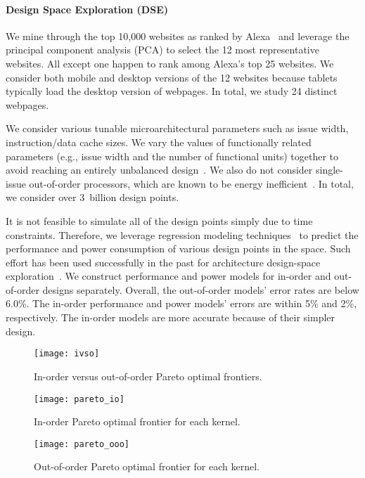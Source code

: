 

\paragraph{Design Space Exploration (DSE)} We mine through the top 10,000 websites as ranked by Alexa~\cite{alexa} and leverage the principal component analysis (PCA) to select the 12 most representative websites. All except one happen to rank among Alexa's top 25 websites. We consider both mobile and desktop versions of the 12 websites because tablets typically load the desktop version of webpages. In total, we study 24 distinct webpages.

We consider various tunable microarchitectural parameters such as issue width, instruction/data cache sizes. We vary the values of functionally related parameters (e.g., issue width and the number of functional units) together to avoid reaching an entirely unbalanced design~\cite{ilp2}. We also do not consider single-issue out-of-order processors, which are known to be energy inefficient~\cite{marginal}. In total, we consider over 3~billion design points.

It is not feasible to simulate all of the design points simply due to time constraints. Therefore, we leverage regression modeling techniques~\cite{RMS} to predict the performance and power consumption of various design points in the space. Such effort has been used successfully in the past for architecture design-space exploration~\cite{dse,comt}. We construct performance and power models for in-order and out-of-order designs separately. Overall, the out-of-order models' error rates are below 6.0\%. The in-order performance and power models' errors are within 5\% and 2\%, respectively. The in-order models are more accurate because of their simpler design.

\begin{figure}[t]
  \centering
  \texttt{[image: ivso]}
  \caption{In-order versus out-of-order Pareto optimal frontiers.}
  \label{fig:ivso}
\end{figure}

\begin{figure}[t]
  \centering
  \texttt{[image: pareto\_io]}
  \caption{In-order Pareto optimal frontier for each kernel.}
  \label{fig:pareto_io}
\end{figure}

\begin{figure}[t]
  \centering
  \texttt{[image: pareto\_ooo]}
  \caption{Out-of-order Pareto optimal frontier for each kernel.}
  \label{fig:pareto_ooo}
\end{figure}

